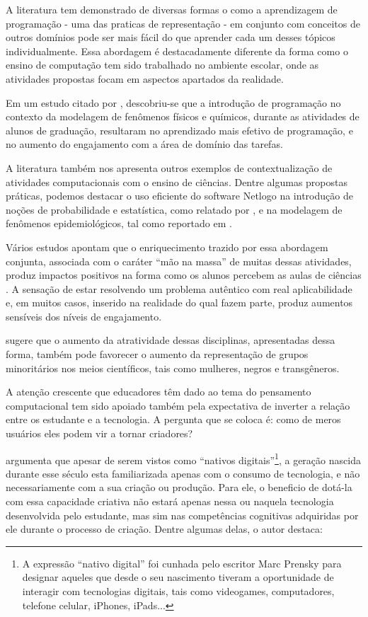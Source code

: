 A literatura tem demonstrado de diversas formas o como a aprendizagem de programação - uma das praticas de representação - em conjunto com conceitos de outros domínios pode ser mais fácil do que aprender cada um desses tópicos individualmente. Essa abordagem é destacadamente diferente da forma como o ensino de computação tem sido trabalhado no ambiente escolar, onde as atividades propostas focam em aspectos apartados da realidade.

Em um estudo citado por , descobriu-se que a introdução de programação no contexto da modelagem de fenômenos físicos e químicos, durante as atividades de alunos de graduação, resultaram no aprendizado mais efetivo de programação, e no aumento do engajamento com a área de domínio das tarefas.

A literatura também nos apresenta outros exemplos de contextualização de atividades computacionais com o ensino de ciências. Dentre algumas propostas práticas, podemos destacar o uso eficiente do software Netlogo \cite{netlogo} na introdução de noções de probabilidade e estatística, como relatado por , e na modelagem de fenômenos epidemiológicos, tal como reportado em \cite{Lee:2011:CTY:1929887.1929902}.

Vários estudos apontam que o enriquecimento trazido por essa abordagem conjunta, associada com o caráter ``mão na massa'' de muitas dessas atividades, produz impactos positivos na forma como os alunos percebem as aulas de ciências \cite{Lee:2011:CTY:1929887.1929902, Barr2011}. A sensação de estar resolvendo um problema autêntico com real aplicabilidade e, em muitos casos, inserido na realidade do qual fazem parte, produz aumentos sensíveis dos níveis de engajamento.

 sugere que o aumento da atratividade dessas disciplinas, apresentadas dessa forma, também pode favorecer o aumento da representação de grupos minoritários nos meios científicos, tais como mulheres, negros e transgêneros.

A atenção crescente que educadores têm dado ao tema do pensamento computacional tem sido apoiado também pela expectativa de inverter a relação entre os estudante e a tecnologia. A pergunta que se coloca é: como de meros usuários eles podem vir a tornar criadores? 

 argumenta que apesar de serem vistos como ``nativos digitais''\footnote{A expressão ``nativo digital'' foi cunhada pelo escritor Marc Prensky para designar aqueles que desde o seu nascimento tiveram a oportunidade de interagir com tecnologias digitais, tais como videogames, computadores, telefone celular, iPhones, iPads...},  a geração nascida durante esse século esta familiarizada apenas com o consumo de tecnologia, e não necessariamente com a sua criação ou produção. Para ele, o beneficio de dotá-la com essa capacidade criativa não estará apenas nessa ou naquela tecnologia desenvolvida pelo estudante, mas sim nas competências cognitivas adquiridas por ele durante o processo de criação. Dentre algumas delas, o autor destaca:


